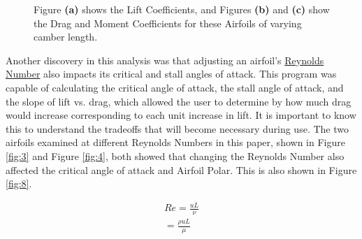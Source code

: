 \documentclass{article}
\begin{document}
\begin{figure}[!htb]
  \centering
   \label{fig:2}
   \label{fig:2}
   \label{fig:2}
  \caption{Figure \textbf{(a)} shows the Lift Coefficients, and Figures \textbf{(b)} and \textbf{(c)} show the Drag and Moment Coefficients for these Airfoils of varying camber length.}
  \label{fig:2}
\end{figure}

Another discovery in this analysis was that adjusting an airfoil's \hyperlink{Re}{Reynolds Number} also impacts its critical and stall angles of attack. This program was capable of calculating the critical angle of attack, the stall angle of attack, and the slope of lift vs. drag, which allowed the user to determine by how much drag would increase corresponding to each unit increase in lift. It is important to know this to understand the tradeoffs that will become necessary during use. The two airfoils examined at different Reynolds Numbers in this paper, shown in Figure \ref{fig:3} and Figure \ref{fig:4}, both showed that changing the Reynolds Number also affected the critical angle of attack and Airfoil Polar. This is also shown in Figure \ref{fig:8}. \newline

\begin{equation} \label{eq:4}
\begin{aligned}
        	Re = \frac{uL}{\nu} \\
	= \frac{\rho uL}{\mu} 
\end{aligned}
\end{equation}
\newline
\end{document}
